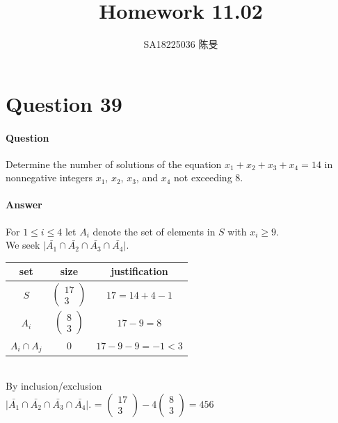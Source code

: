 \documentclass[UTF8]{article}
\title{Homework 11.02}
\author{SA18225036 陈旻}
\date{}
\begin{document}
    \maketitle
    \section{Question 39}
    \paragraph{Question}
    Determine the number of solutions of the equation $ x_{1} + x_{2} + x_{3} + x_{4} = 14 $ in nonnegative integers $ x_{1} $, $ x_{2} $, $ x_{3} $, and $ x_{4} $ not exceeding 8.
    \paragraph{Answer}
    \begin{center}
        For $ 1 \leq i \leq 4 $ let $ A_{i} $ denote the set of elements in $S$ with $x_{i} \geq 9$. \\
        We seek $\vert \bar{A_{1}} \cap \bar{A_{2}} \cap \bar{A_{3}} \cap \bar{A_{4}}\vert. $ \\
        \vspace{6pt}
        \begin{tabular}{c|c|c}
            \toprule
            set & size & justification\\
            \midrule
            $S$ & $\begin{pmatrix} 17 \\ 3 \end{pmatrix}$ & $17 = 14 + 4 - 1$\\
            $A_{i}$ & $\begin{pmatrix} 8 \\ 3 \end{pmatrix}$ & $17 - 9 = 8$\\
            $A_{i} \cap A_{j}$ & $ 0 $ & $17 - 9 - 9 = -1 < 3$\\
            \bottomrule
        \end{tabular} \\
        By inclusion/exclusion \\
        $\vert \bar{A_{1}} \cap \bar{A_{2}} \cap \bar{A_{3}} \cap \bar{A_{4}}\vert. $ = $\begin{pmatrix} 17 \\ 3 \end{pmatrix} - 4\begin{pmatrix} 8 \\ 3 \end{pmatrix} = 456$
    \end{center}
\end{document}
